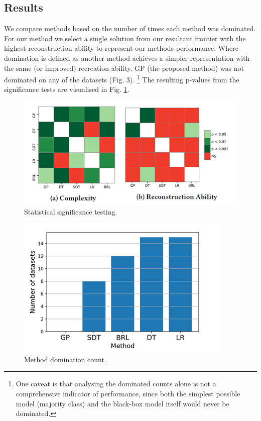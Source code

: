 \subsection{Results}
We compare methods based on the number of times each method was dominated. For our method we select a single solution from our resultant frontier with the highest reconstruction ability to represent our methods performance. Where domination is defined as another method achieves a simpler representation with the same (or improved) recreation ability. GP (the proposed method) was not dominated on any of the datasets (Fig. 3). \footnote{One caveat is that analysing the dominated counts alone is not a comprehensive indicator of performance, since both the simplest possible model (majority class) and the black-box model itself would never be dominated.} The resulting p-values from the significance tests are visualised in Fig. \ref{stats}.
%
\begin{center}
\begin{figure}[h]
\includegraphics{result_analysis_resized}
\caption{Statistical significance testing.}
\label{stats}
\end{figure}
\end{center}

\begin{center}
\begin{figure}[h]
\includegraphics{domination_bar_chart}
\caption{Method domination count.}
\end{figure}
\end{center}

